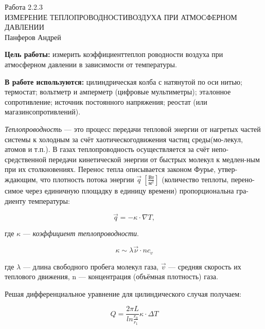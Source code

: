 



\begin{center}
  \LARGE{Работа 2.2.3}\\[0.2cm]
  \LARGE{ИЗМЕРЕНИЕ ТЕПЛОПРОВОДНОСТИВОЗДУХА ПРИ АТМОСФЕРНОМ ДАВЛЕНИИ}\\[0.2cm]
  \large{Панферов Андрей}\\[0.2cm]
\end{center}

\textbf{Цель работы:} измерить коэффициенттеплоп  роводности воздуха при атмосферном давлении в зависимости от температуры. 

\textbf{В работе используются:} цилиндрическая колба с натянутой по оси нитью; термостат; вольтметр и амперметр (цифровые мультиметры); эталонное сопротивление; источник постоянного напряжения; реостат (или магазинсопротивлений).

\begin{center}
\end{center}

\textit{Теплопроводность} — это процесс передачи тепловой энергии от нагретых частей системы к холодным за счёт хаотическогодвижения частиц среды(мо-лекул, атомов и т.п.). В газах теплопроводность осуществляется за счёт непо-средственной передачи кинетической энергии от быстрых молекул к медлен-ным при их столкновениях. Перенос тепла описывается законом Фурье, утвер-ждающим, что плотность потока энергии $\vec{q} \: [\frac{Вт}{м^{2}}]$ (количество теплоты, перено-симое   через единичную площадку в единицу времени) пропорциональна гра-диенту температуры:

\begin{equation*}
	\vec{q} = -\kappa \cdot \nabla T,
\end{equation*}

где $\kappa$ — \textit{коэффициент теплопроводности}.

\begin{equation*}
	\kappa \sim \lambda \vec{\nu} \cdot n c_v
\end{equation*}

где $\lambda$  — длина свободного пробега молекул газа, $\vec{v}$ — средняя скорость их теплового движения, n — концентрация (объёмная плотность) газа.

Решая дифференциальное уравнение для цилиндического случая получаем:

\begin{equation*}
	Q = \frac{2\pi L}{ln\frac{r_0}{r_1}} \kappa \cdot \Delta T
\end{equation*}



